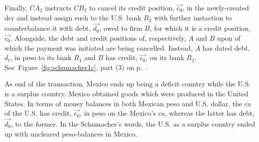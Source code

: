 Finally, $CA_2$ instructs $CB_2$ to cancel its credit position, $\overrightarrow{c_0}$, in the newly-created \ac{dcr} and instead assign such to the U.S. bank $R_2$ with further instaction to counterbalance it with debt, $\overrightarrow{d_0}$, owed to firm $B$, for which it is a credit position, $\overrightarrow{c_0}$. Alongside, the debt and credit positions of, respectively, $A$ and $B$ upon of which the payment was initiated are being cancelled. Instead, $A$ has dated debt, $d_t$, in peso to its bank $R_1$ and $B$ has credit, $\overrightarrow{c_0}$, on its bank $R_2$. See~Figure~\ref{fig:schumacher1c}, part (3) on p.~\pageref{fig:schumacher1c}.     

As end of the transaction, Mexico ends up being a deficit country while the U.S. is a surplus country. Mexico obtained goods which were produced in the United States. In terms of money balances in both Mexican peso and U.S. dollar, the \ac{ca} of the U.S. has credit, $\overrightarrow{c_0}$,  in peso on the Mexico's \ac{ca}, whereas the latter has debt, $\overrightarrow{d_0}$, to the former. In the Schumacher's words, the U.S. as a surplus country ended up with uncleared peso-balances in Mexico.

